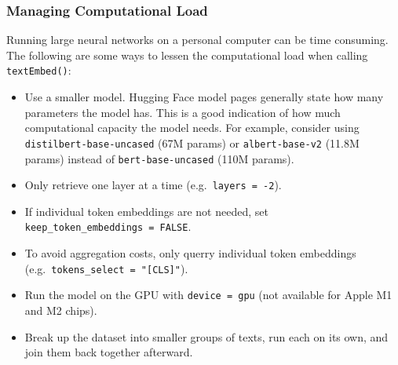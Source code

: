 \documentclass[
  man,
  floatsintext,
  longtable,
  nolmodern,
  notxfonts,
  notimes,
  colorlinks=true,linkcolor=blue,citecolor=blue,urlcolor=blue]{apa7}
\newenvironment{Shaded}{\begin{snugshade}}{\end{snugshade}}
\newcommand{\AttributeTok}[1]{\textcolor[rgb]{0.40,0.45,0.13}{#1}}
\newcommand{\CommentTok}[1]{\textcolor[rgb]{0.37,0.37,0.37}{#1}}
\newcommand{\DecValTok}[1]{\textcolor[rgb]{0.68,0.00,0.00}{#1}}
\newcommand{\FunctionTok}[1]{\textcolor[rgb]{0.28,0.35,0.67}{#1}}
\newcommand{\NormalTok}[1]{\textcolor[rgb]{0.00,0.23,0.31}{#1}}
\newcommand{\OtherTok}[1]{\textcolor[rgb]{0.00,0.23,0.31}{#1}}
\newcommand{\SpecialCharTok}[1]{\textcolor[rgb]{0.37,0.37,0.37}{#1}}
\newcommand{\StringTok}[1]{\textcolor[rgb]{0.13,0.47,0.30}{#1}}
\providecommand{\tightlist}{%
  \setlength{\itemsep}{0pt}\setlength{\parskip}{0pt}}
\begin{document}
\begin{Shaded}
\end{Shaded}

\subsubsection{Managing Computational
Load}\label{managing-computational-load}

Running large neural networks on a personal computer can be time
consuming. The following are some ways to lessen the computational load
when calling \texttt{textEmbed()}:

\begin{itemize}
\tightlist
\item
  Use a smaller model. Hugging Face model pages generally state how many
  parameters the model has. This is a good indication of how much
  computational capacity the model needs. For example, consider using
  \texttt{distilbert-base-uncased} (67M params) or
  \texttt{albert-base-v2} (11.8M params) instead of
  \texttt{bert-base-uncased} (110M params).
\item
  Only retrieve one layer at a time (e.g.~\texttt{layers\ =\ -2}).
\item
  If individual token embeddings are not needed, set
  \texttt{keep\_token\_embeddings\ =\ FALSE}.
\item
  To avoid aggregation costs, only querry individual token embeddings
  (e.g.~\texttt{tokens\_select\ =\ "{[}CLS{]}"}).
\item
  Run the model on the GPU with
  \texttt{device\ =\ \textquotesingle{}gpu\textquotesingle{}} (not
  available for Apple M1 and M2 chips).
\item
  Break up the dataset into smaller groups of texts, run each on its
  own, and join them back together afterward.
\end{itemize}
\end{document}
